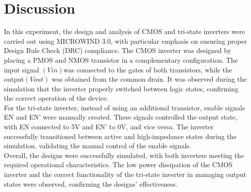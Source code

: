 \documentclass[a4paper,12pt]{article}
\begin{document}
\newpage
\section{Discussion }


In this experiment, the design and analysis of CMOS and tri-state inverters were carried out using MICROWIND 3.0, with particular emphasis on ensuring proper Design Rule Check (DRC) compliance. The CMOS inverter was designed by placing a PMOS and NMOS transistor in a complementary configuration. The input signal $(Vin)$was connected to the gates of both transistors, while the output$(Vout)$ was obtained from the common drain. It was observed during the simulation that the inverter properly switched between logic states, confirming the correct operation of the device.\\
For the tri-state inverter, instead of using an additional transistor, enable signals EN and EN' were manually created. These signals controlled the output state, with EN connected to 5V and EN' to 0V, and vice versa. The inverter successfully transitioned between active and high-impedance states during the simulation, validating the manual control of the enable signals.\\
Overall, the designs were successfully simulated, with both inverters meeting the required operational characteristics. The low power dissipation of the CMOS inverter and the correct functionality of the tri-state inverter in managing output states were observed, confirming the designs' effectiveness.
\end{document}
